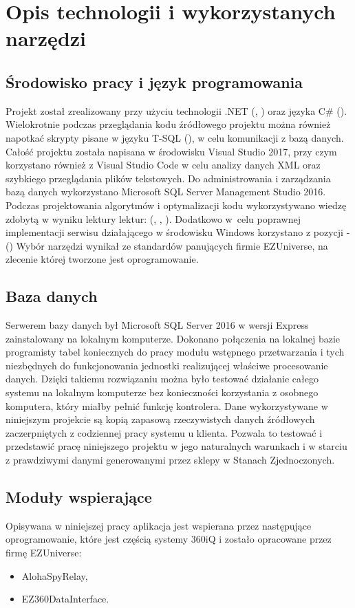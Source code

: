 \documentclass[a4paper]{book}
\begin{document}
\section{Opis technologii i wykorzystanych narzędzi}
\subsection{Środowisko pracy i język programowania}
Projekt został zrealizowany przy użyciu technologii .NET (\cite{aspnet}, \cite{aspnet}) oraz języka C\# (\cite{ruszglowa}).
Wielokrotnie podczas przeglądania kodu źródłowego projektu można również napotkać skrypty pisane w języku T-SQL (\cite{tsql}), w celu komunikacji z bazą danych.
Całość projektu została napisana w środowisku Visual Studio 2017, przy czym korzystano również z Visual Studio Code w celu analizy danych XML oraz szybkiego przeglądania plików tekstowych.
Do administrowania i zarządzania bazą danych wykorzystano Microsoft SQL Server Management Studio 2016.
Podczas projektowania algorytmów i optymalizacji kodu wykorzystywano wiedzę zdobytą w wyniku lektury lektur: (\cite{algorytmy}, \cite{perelki}, \cite{wzorceprojektowe}).
Dodatkowo w~celu poprawnej implementacji serwisu działającego w środowisku Windows korzystano z pozycji - (\cite{progwin})
Wybór narzędzi wynikał ze standardów panujących firmie EZUniverse, na zlecenie której tworzone jest oprogramowanie.
\subsection{Baza danych}
Serwerem bazy danych był Microsoft SQL Server 2016 w wersji Express zainstalowany na lokalnym komputerze. Dokonano połączenia na lokalnej bazie programisty tabel koniecznych do pracy modułu wstępnego przetwarzania i tych niezbędnych do funkcjonowania jednostki realizującej właściwe procesowanie danych.
Dzięki takiemu rozwiązaniu można było testować działanie całego systemu na lokalnym komputerze bez konieczności korzystania z osobnego komputera, który miałby pełnić funkcję kontrolera.
Dane wykorzystywane w niniejszym projekcie są kopią zapasową rzeczywistych danych źródłowych zaczerpniętych z codziennej pracy systemu u klienta. Pozwala to testować i przedstawić pracę niniejszego projektu w jego naturalnych warunkach i w starciu z prawdziwymi danymi generowanymi przez sklepy w Stanach Zjednoczonych.
\subsection{Moduły wspierające}
Opisywana w niniejszej pracy aplikacja jest wspierana przez następujące oprogramowanie, które jest częścią systemy 360iQ i zostało opracowane przez firmę EZUniverse:
 \begin{itemize}
 	\item AlohaSpyRelay,
 	\item EZ360DataInterface.
 \end{itemize}
\end{document}
